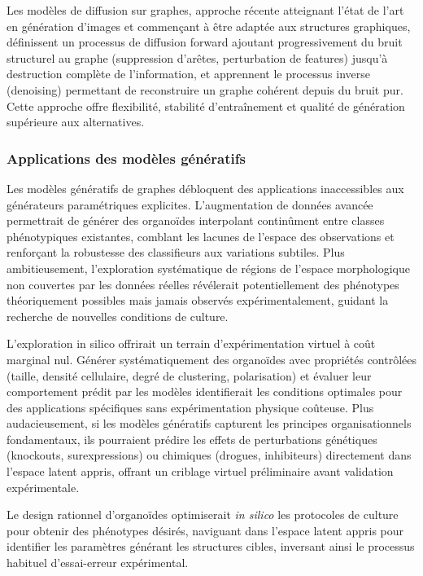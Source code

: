 Les modèles de diffusion sur graphes, approche récente atteignant l'état de l'art en génération d'images et commençant à être adaptée aux structures graphiques, définissent un processus de diffusion forward ajoutant progressivement du bruit structurel au graphe (suppression d'arêtes, perturbation de features) jusqu'à destruction complète de l'information, et apprennent le processus inverse (denoising) permettant de reconstruire un graphe cohérent depuis du bruit pur. Cette approche offre flexibilité, stabilité d'entraînement et qualité de génération supérieure aux alternatives.

\subsubsection{Applications des modèles génératifs}

Les modèles génératifs de graphes débloquent des applications inaccessibles aux générateurs paramétriques explicites. L'augmentation de données avancée permettrait de générer des organoïdes interpolant continûment entre classes phénotypiques existantes, comblant les lacunes de l'espace des observations et renforçant la robustesse des classifieurs aux variations subtiles. Plus ambitieusement, l'exploration systématique de régions de l'espace morphologique non couvertes par les données réelles révélerait potentiellement des phénotypes théoriquement possibles mais jamais observés expérimentalement, guidant la recherche de nouvelles conditions de culture.

L'exploration in silico offrirait un terrain d'expérimentation virtuel à coût marginal nul. Générer systématiquement des organoïdes avec propriétés contrôlées (taille, densité cellulaire, degré de clustering, polarisation) et évaluer leur comportement prédit par les modèles identifierait les conditions optimales pour des applications spécifiques sans expérimentation physique coûteuse. Plus audacieusement, si les modèles génératifs capturent les principes organisationnels fondamentaux, ils pourraient prédire les effets de perturbations génétiques (knockouts, surexpressions) ou chimiques (drogues, inhibiteurs) directement dans l'espace latent appris, offrant un criblage virtuel préliminaire avant validation expérimentale.

Le design rationnel d'organoïdes optimiserait \textit{in silico} les protocoles de culture pour obtenir des phénotypes désirés, naviguant dans l'espace latent appris pour identifier les paramètres générant les structures cibles, inversant ainsi le processus habituel d'essai-erreur expérimental.

